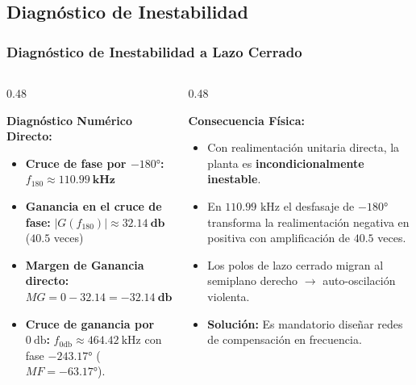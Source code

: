 \documentclass[aspectratio=169, 10pt]{beamer}
\begin{document}
\subsection{Diagnóstico de Inestabilidad}
\begin{frame}
  \frametitle{Diagnóstico de Inestabilidad a Lazo Cerrado}

  \begin{columns}[t, onlytextwidth]
    \begin{column}{0.48\textwidth}
      \begin{tarjeta}[colframe=AlertRed]
        {\fontsize{9pt}{11pt}\selectfont \textbf{\color{AlertRed} Diagnóstico Numérico Directo:}}\\[2pt]
        {\fontsize{8pt}{10pt}\selectfont
        \begin{itemize}\setlength{\itemsep}{2.5pt}
          \item \textbf{Cruce de fase por $\ang{-180}$:}
          $f_{180} \approx \mathbf{\qty{110.99}{\kilo\hertz}}$
          \item \textbf{Ganancia en el cruce de fase:}
          $|G(f_{180})| \approx \mathbf{\qty{32.14}{\decibel}}$ ($40.5$ veces)
          \item \textbf{Margen de Ganancia directo:}
          $MG = 0 - 32.14 = \mathbf{-32.14\ \unit{\decibel}}$
          \item \textbf{Cruce de ganancia por $\qty{0}{\decibel}$:}
          $f_{0\si{\decibel}} \approx \qty{464.42}{\kilo\hertz}$ con fase $\ang{-243.17}$ ($MF = \ang{-63.17}$).
        \end{itemize}
        }
      \end{tarjeta}
    \end{column}

    \begin{column}{0.48\textwidth}
      \begin{tarjeta}
        {\fontsize{9pt}{11pt}\selectfont \textbf{\color{NavyDark} Consecuencia Física:}}\\[2pt]
        {\fontsize{8pt}{10pt}\selectfont
        \begin{itemize}\setlength{\itemsep}{2.5pt}
          \item Con realimentación unitaria directa, la planta es \textbf{incondicionalmente inestable}.
          \item En $110.99\text{ kHz}$ el desfasaje de $\ang{-180}$ transforma la realimentación negativa en positiva con amplificación de $40.5$ veces.
          \item Los polos de lazo cerrado migran al semiplano derecho $\to$ auto-oscilación violenta.
          \item \textbf{Solución:} Es mandatorio diseñar redes de compensación en frecuencia.
        \end{itemize}
        }
      \end{tarjeta}
    \end{column}
  \end{columns}
\end{frame}
\end{document}
